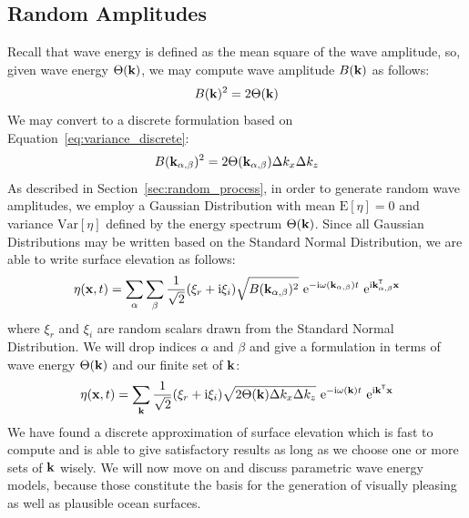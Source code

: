 \subsection{Random Amplitudes}
\label{sec:random_amplitudes}
Recall that wave energy is defined as the mean square of the wave amplitude, so,
given wave energy $\Theta(\mathbf{k})$, we may compute wave amplitude 
$B(\mathbf{k})$ as follows:
\begin{equation*}
 B(\mathbf{k})^2 = 2\Theta(\mathbf{k})
\end{equation*}
We may convert to a discrete formulation based on 
Equation~\ref{eq:variance_discrete}:
\begin{equation*}
 B(\mathbf{k}_{\alpha,\beta})^2 = 2\Theta(\mathbf{k}_{\alpha,\beta})\Delta k_x 
\Delta k_z
\end{equation*}
As described in Section~\ref{sec:random_process}, in order to generate random 
wave amplitudes, we employ a Gaussian Distribution with mean $\mathrm{E}[\eta] 
= 0$ and variance $\mathrm{Var}[\eta]$ defined by the energy spectrum
$\Theta(\mathbf{k})$. Since all Gaussian Distributions may be written based on 
the Standard Normal Distribution, we are able to write surface elevation as 
follows:
\begin{equation*}
 \eta(\mathbf{x}, t) = 
\sum_{\alpha}\sum_{\beta}\frac{1}{\sqrt{2}}(\xi_r+\mathrm{i}\xi_i)\sqrt{B(\mathbf{
k}_{\alpha,\beta})^2}~\mathrm{e}^{-\mathrm{i}\omega(\mathbf{k}_{\alpha,\beta}) 
t}~\mathrm{e}^{\mathrm{i}\mathbf{k}_{\alpha,\beta}^{\mathsf{T}}\mathbf{x}}
\end{equation*}
where $\xi_r$ and $\xi_i$ are random scalars drawn from the Standard Normal Distribution.
We will drop indices $\alpha$ and $\beta$ and give 
a formulation in terms of wave energy $\Theta(\mathbf{k})$ and our finite set of 
\wavevectors $\mathbf{k}$:
\begin{equation}
\label{eq:surface_elevation_discrete}
 \eta(\mathbf{x}, t) = 
\sum_{\mathbf{k}}\frac{1}{\sqrt{2}}(\xi_r+\mathrm{i}\xi_i)
\sqrt{2\Theta(\mathbf{k})\Delta k_x \Delta k_z} 
~\mathrm{e}^{-\mathrm{i}\omega(\mathbf{k})t}
~\mathrm{e}^{\mathrm{i}\mathbf{k}^{\mathsf{T}}\mathbf{x}}
\end{equation}
%
We have found a discrete approximation of surface elevation which is fast to 
compute and is able to give satisfactory results as long as we choose one or 
more sets of \wavevectors $\mathbf{k}$ wisely. We will now move on and discuss
parametric wave energy models, because those constitute the basis for the
generation of visually pleasing as well as plausible ocean surfaces.
%

